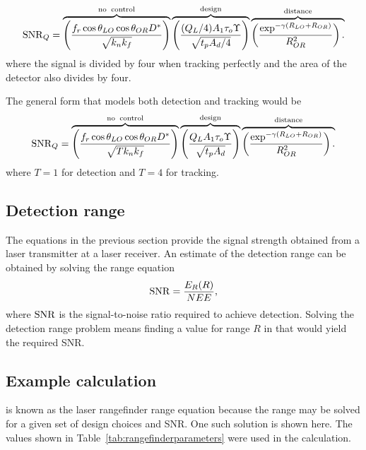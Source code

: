 \begin{equation}
\operatorname{SNR}_Q=
\overbrace{
\left(\frac{f_r  \cos\theta_{LO} \cos\theta_{OR} D^\ast }{\sqrt{k_nk_f}}\right)
}^{\rm no\;\;control}
\overbrace{
\left(\frac{(Q_L/4) A_1 \tau_o \Upsilon}{\sqrt{t_p A_d/4}}\right)
}^{\rm design}
\overbrace{
\left(\frac{\exp^{-\gamma (R_{LO}+R_{OR})} }{R^2_{OR}}\right).\\
}^{\rm distance}
\label{lrfd2f}
\end{equation}
where the signal is divided by four when tracking perfectly and the area of the detector also divides by four.


The general form that models both detection and tracking would be
\begin{equation}
\operatorname{SNR}_Q=
\overbrace{
\left(\frac{f_r  \cos\theta_{LO} \cos\theta_{OR} D^\ast }{\sqrt{T k_nk_f}}\right)
}^{\rm no\;\;control}
\overbrace{
\left(\frac{Q_L A_1 \tau_o \Upsilon}{\sqrt{t_p A_d}}\right)
}^{\rm design}
\overbrace{
\left(\frac{\exp^{-\gamma (R_{LO}+R_{OR})} }{R^2_{OR}}\right).\\
}^{\rm distance}
\label{lrfd2g}
\end{equation}
where $T=1$ for detection and $T=4$ for tracking.




\subsection{Detection range}
\noindent
The equations in the previous section provide the signal strength obtained from a laser transmitter at a laser receiver. An estimate of the detection range can be obtained by solving the range equation
\begin{equation}
\operatorname{SNR}=\frac{E_R(R)}{NEE},
\label{eq:laserdetectionsnrerror}
\end{equation}
where $\operatorname{SNR}$ is the signal-to-noise ratio required to achieve detection. Solving the detection range problem means finding a value for range $R$ in  that would yield the required SNR. 


\subsection{Example calculation}
\noindent
{} is known as the laser rangefinder range equation because the range may be solved for a given set of design choices and SNR. One such solution is shown here.  The values shown in Table~\ref{tab:rangefinderparameters} were used in the calculation.



